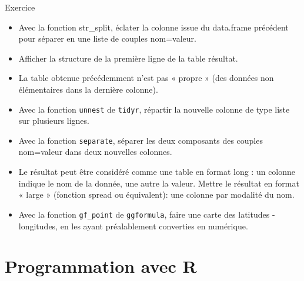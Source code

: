 \documentclass[
  ignorenonframetext,
]{beamer}
\providecommand{\tightlist}{%
  \setlength{\itemsep}{0pt}\setlength{\parskip}{0pt}}
\begin{document}
\begin{frame}[fragile]{Exercice}
\protect\hypertarget{exercice-1}{}
\begin{itemize}
\tightlist
\item
  Avec la fonction str\_split, éclater la colonne issue du data.frame
  précédent pour séparer en une liste de couples nom=valeur.
\item
  Afficher la structure de la première ligne de la table résultat.
\item
  La table obtenue précédemment n'est pas « propre » (des données non
  élémentaires dans la dernière colonne).
\item
  Avec la fonction \texttt{unnest} de \texttt{tidyr}, répartir la
  nouvelle colonne de type liste sur plusieurs lignes.
\item
  Avec la fonction \texttt{separate}, séparer les deux composants des
  couples nom=valeur dans deux nouvelles colonnes.
\item
  Le résultat peut être considéré comme une table en format long : un
  colonne indique le nom de la donnée, une autre la valeur. Mettre le
  résultat en format « large » (fonction spread ou équivalent): une
  colonne par modalité du nom.
\item
  Avec la fonction \texttt{gf\_point} de \texttt{ggformula}, faire une
  carte des latitudes - longitudes, en les ayant préalablement
  converties en numérique.
\end{itemize}
\end{frame}

\hypertarget{programmation-avec-r}{%
\section{Programmation avec R}\label{programmation-avec-r}}
\end{document}
